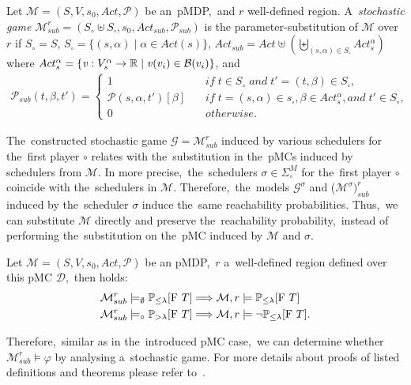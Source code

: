 \begin{definition}
Let $\mathcal{M} = (S, V, s_0, Act, \mathcal{P})$ be an~pMDP,~and $r$ well-defined region.
A~\textit{stochastic game} $\mathcal{M}_{sub}^r = (S_{\circ} \uplus S_{\square}, s_0, Act_{sub}, \mathcal{P}_{sub})$ is the parameter-substitution of $\mathcal{M}$ over $r$ if $S_{\circ} = S$, $S_{\square} = \{ (s, \alpha) \; \lvert \; \alpha \in Act(s) \}$, $Act_{sub} = Act \uplus (\biguplus_{(s, \alpha) \in S_{\square}}Act_s^\alpha)$ where $Act_s^\alpha = \{\mathit{v}: V_s^\alpha \rightarrow \mathbb{R} \; \lvert \; \mathit{v}(v_i) \in \mathcal{B}(v_i) \}$, and
\begin{align*}
    \mathcal{P}_{sub}(t, \beta, t') = 
    \begin{cases}
        1 \quad & if \; t \in S_\circ \; and \; t' = (t, \beta) \in S_\square, \\
        \mathcal{P}(s, \alpha, t')[\beta] \quad & if \; t = (s, \alpha) \in s_\square, \beta \in Act_s^\alpha, and \; t' \in S_\circ, \\
        0 \quad & otherwise.
    \end{cases}
\end{align*}
\end{definition}
\noindent
The~constructed stochastic game $\mathcal{G} = \mathcal{M}_{sub}^r$ induced by various schedulers for the~first player $\circ$ relates with the~substitution in the~pMCs induced by schedulers from $\mathcal{M}$. 
In more precise,~the~schedulers $\sigma \in \Sigma^M_\circ$ for the~first player $\circ$ coincide with the~schedulers in $\mathcal{M}$.
Therefore,~the~models $\mathcal{G}^\sigma$ and ($\mathcal{M}^\sigma)_{sub}^r$ induced by the~scheduler $\sigma$ induce the~same reachability probabilities.
Thus,~we can substitute $\mathcal{M}$ directly and preserve the~reachability probability,~instead of performing the~substitution on the~pMC induced by $\mathcal{M}$ and $\sigma$.

\begin{theorem}
Let $\mathcal{M} = (S, V, s_0, Act, \mathcal{P})$ be an pMDP,~$r$ a~well-defined region defined over this pMC $\mathcal{D}$,~then holds:
\begin{align*}
    \mathcal{M}_{sub}^{r} \models_{\emptyset} \mathbb{P}_{\leq \lambda}[\mathrm{F}\ T] \Longrightarrow \mathcal{M}, r \models & \; \mathbb{P}_{\leq \lambda}[\mathrm{F}\ T] \\
    \mathcal{M}_{sub}^{r} \models_{\circ} \mathbb{P}_{> \lambda}[\mathrm{F}\ T] \Longrightarrow \mathcal{M}, r \models & \; \neg\mathbb{P}_{\leq \lambda}[\mathrm{F}\ T].
\end{align*}
\end{theorem}
\noindent
Therefore,~similar as in the~introduced pMC case,~we can determine whether $\mathcal{M}_{sub}^r \models \varphi$ by analysing a~stochastic game.
For more details about proofs of listed definitions and theorems please refer to~\cite{Quatmann2016}.



